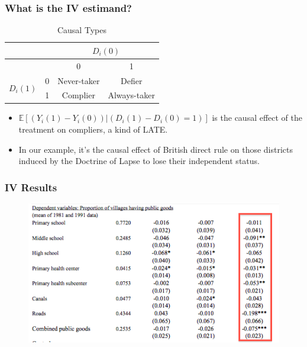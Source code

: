 \documentclass{beamer}
\begin{document}
\begin{frame}
  \frametitle{What is the IV estimand?}
  \begin{table}[h]
    \centering
    \begin{tabular}{c c c c}
& & \multicolumn{2}{c}{$D_i(0)$} \\ \hline
& & 0 & 1 \\ \hline
\multirow{2}{*}{$D_i(1)$}&0 & Never-taker & Defier\\
&1 & Complier & Always-taker \\ \hline
      
    \end{tabular}
    \caption{Causal Types}
  \end{table}
  \begin{itemize}
  \item $\mathbb{E}[(Y_i(1)-Y_i(0))|(D_i(1)-D_i(0)=1)]$ is the causal
    effect of the treatment on compliers, a kind of LATE. 
  \item In our example, it's the causal effect of British direct rule
    on those districts induced by the Doctrine of Lapse to lose their
    independent status.  
  \end{itemize}
\end{frame}

\begin{frame}
  \frametitle{IV Results}
  \begin{figure}[t]
    \centering
      \includegraphics[scale=.7]{ivresults}
 \end{figure}
\end{frame}
\end{document}
